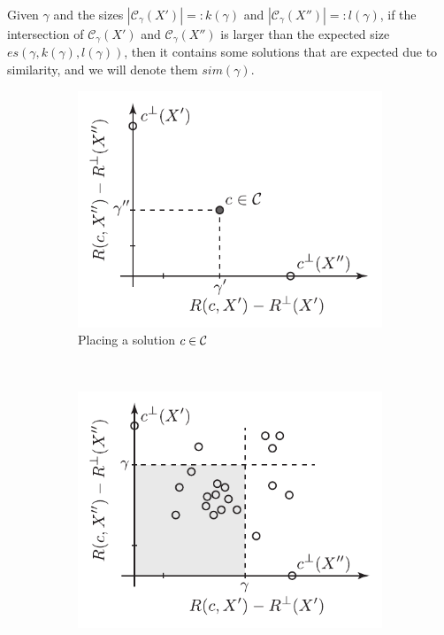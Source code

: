 \begin{definition} \label{def:intersection_due_to_sim}
  Given $\gamma$ and the sizes $|{\mathcal{C}_\gamma}(X')| =: k(\gamma)$ and
  $|{\mathcal{C}_\gamma}(X'')| =: l(\gamma)$, if the intersection of
  ${\mathcal{C}_\gamma}(X')$ and ${\mathcal{C}_\gamma}(X'')$ is larger than the
  expected size $es(\gamma,k(\gamma),l(\gamma))$, then it contains some
  solutions that are expected due to similarity, and we will denote them
  $sim(\gamma)$.
\end{definition}
%
%
\begin{figure}[t!]
  \centering
  \begin{subfigure}[b]{.55\textwidth}
      \label{fig:approx_sets--example--1} 
      \includegraphics[width=\linewidth]{figures/ch_generic_approach/approx_sets--schematic--1}
      \caption{Placing a solution $c \in {\cal C}$}
  \end{subfigure}
  \\[.5cm]
  \begin{subfigure}[b]{.55\textwidth}
      \label{fig:approx_sets--example--3}
      \includegraphics[width=\linewidth]{figures/ch_generic_approach/approx_sets--schematic--3}

\end{subfigure}
\end{figure}
